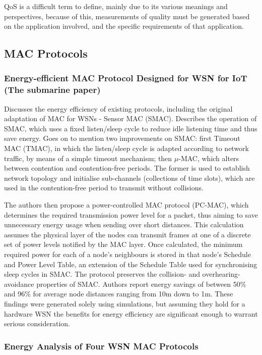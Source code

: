 QoS is a difficult term to define, mainly due to its various meanings and perspectives, because of this, measurements of quality must be generated based on the application involved, and the specific requirements of that application.

\subsection{MAC Protocols}

\subsubsection*{Energy-efficient MAC Protocol Designed for WSN for IoT (The submarine paper)\cite{6128220}}

Discusses the energy efficiency of existing protocols, including the original adaptation of MAC for WSNs - Sensor MAC (SMAC). Describes the operation of SMAC, which uses a fixed listen/sleep cycle to reduce idle listening time and thus save energy. Goes on to mention two improvements on SMAC: first Timeout MAC (TMAC), in which the listen/sleep cycle is adapted according to network traffic, by means of a simple timeout mechanism; then $\mu$-MAC, which alters between contention and contention-free periods. The former is used to establish network topology and initialise sub-channels (collections of time slots), which are used in the contention-free period to transmit without collisions.

The authors then propose a power-controlled MAC protocol (PC-MAC), which determines the required transmission power level for a packet, thus aiming to save unnecessary energy usage when sending over short distances. This calculation assumes the physical layer of the nodes can transmit frames at one of a discrete set of power levels notified by the MAC layer. Once calculated, the minimum required power for each of a node's neighbours is stored in that node's Schedule and Power Level Table, an extension of the Schedule Table used for synchronising sleep cycles in SMAC. The protocol preserves the collision- and overhearing-avoidance properties of SMAC.
Authors report energy savings of between 50\% and 96\% for average node distances ranging from 10m down to 1m. These findings were generated solely using simulations, but assuming they hold for a hardware WSN the benefits for energy efficiency are significant enough to warrant serious consideration.


\subsubsection*{Energy Analysis of Four WSN MAC Protocols\cite{5751321}}

